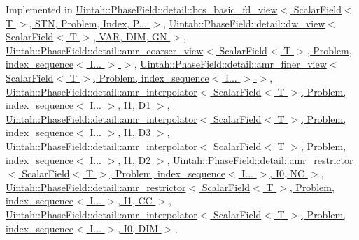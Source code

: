 Implemented in \hyperlink{classUintah_1_1PhaseField_1_1detail_1_1bcs__basic__fd__view_3_01ScalarField_3_01T_01_4_00_01STN_07caa9955adf783da0505eac75e76f08_a5f5cdae9c3953834dfc8167e5ac9dafb}{Uintah\+::\+Phase\+Field\+::detail\+::bcs\+\_\+basic\+\_\+fd\+\_\+view$<$ Scalar\+Field$<$ T $>$, S\+T\+N, Problem, Index, P... $>$}, \hyperlink{classUintah_1_1PhaseField_1_1detail_1_1dw__view_3_01ScalarField_3_01T_01_4_00_01VAR_00_01DIM_00_01GN_01_4_ae8805279b2994368f8a16bcfc4a5dad2}{Uintah\+::\+Phase\+Field\+::detail\+::dw\+\_\+view$<$ Scalar\+Field$<$ T $>$, V\+A\+R, D\+I\+M, G\+N $>$}, \hyperlink{classUintah_1_1PhaseField_1_1detail_1_1amr__coarser__view_3_01ScalarField_3_01T_01_4_00_01Proble9cadea116dab5bdb44bb3e29abbe99ef_a125db112d5568827ed202d5e02610515}{Uintah\+::\+Phase\+Field\+::detail\+::amr\+\_\+coarser\+\_\+view$<$ Scalar\+Field$<$ T $>$, Problem, index\+\_\+sequence$<$ I... $>$ $>$}, \hyperlink{classUintah_1_1PhaseField_1_1detail_1_1amr__finer__view_3_01ScalarField_3_01T_01_4_00_01Problem_810ae3f886a4d3bdb2b37c629369a2ec_a38bba423ebb77e4aaaded71c0c80583e}{Uintah\+::\+Phase\+Field\+::detail\+::amr\+\_\+finer\+\_\+view$<$ Scalar\+Field$<$ T $>$, Problem, index\+\_\+sequence$<$ I... $>$ $>$}, \hyperlink{classUintah_1_1PhaseField_1_1detail_1_1amr__interpolator_3_01ScalarField_3_01T_01_4_00_01Problem71844444bc14a03c0566689b6b502040_ad67d51ec30f811cb8e8ac5c6a87c97e1}{Uintah\+::\+Phase\+Field\+::detail\+::amr\+\_\+interpolator$<$ Scalar\+Field$<$ T $>$, Problem, index\+\_\+sequence$<$ I... $>$, I1, D1 $>$}, \hyperlink{classUintah_1_1PhaseField_1_1detail_1_1amr__interpolator_3_01ScalarField_3_01T_01_4_00_01Problemdf68628a6010a1e1526666730125c372_a69b809d731de3fdfe713ac4321394962}{Uintah\+::\+Phase\+Field\+::detail\+::amr\+\_\+interpolator$<$ Scalar\+Field$<$ T $>$, Problem, index\+\_\+sequence$<$ I... $>$, I1, D3 $>$}, \hyperlink{classUintah_1_1PhaseField_1_1detail_1_1amr__interpolator_3_01ScalarField_3_01T_01_4_00_01Problemd2db9de1754b5450c93c191a9275f5ed_a81fe3ebe5215f1879c8fcacad90a240e}{Uintah\+::\+Phase\+Field\+::detail\+::amr\+\_\+interpolator$<$ Scalar\+Field$<$ T $>$, Problem, index\+\_\+sequence$<$ I... $>$, I1, D2 $>$}, \hyperlink{classUintah_1_1PhaseField_1_1detail_1_1amr__restrictor_3_01ScalarField_3_01T_01_4_00_01Problem_05760ee5d1d3adcc969b3f56f71e72acb_a7756f69a970700829f04886c454a4b18}{Uintah\+::\+Phase\+Field\+::detail\+::amr\+\_\+restrictor$<$ Scalar\+Field$<$ T $>$, Problem, index\+\_\+sequence$<$ I... $>$, I0, N\+C $>$}, \hyperlink{classUintah_1_1PhaseField_1_1detail_1_1amr__restrictor_3_01ScalarField_3_01T_01_4_00_01Problem_0778720acc9a55f696b8537356a4dbcae_ac7b27aad09d6d193f1cfe96ce2f69f8f}{Uintah\+::\+Phase\+Field\+::detail\+::amr\+\_\+restrictor$<$ Scalar\+Field$<$ T $>$, Problem, index\+\_\+sequence$<$ I... $>$, I1, C\+C $>$}, \hyperlink{classUintah_1_1PhaseField_1_1detail_1_1amr__interpolator_3_01ScalarField_3_01T_01_4_00_01Problem64f2458f98b03e27672a091eecc4b696_a6bdc935e6a1d72f8437cbe1b37dcb12c}{Uintah\+::\+Phase\+Field\+::detail\+::amr\+\_\+interpolator$<$ Scalar\+Field$<$ T $>$, Problem, index\+\_\+sequence$<$ I... $>$, I0, D\+I\+M $>$}, 